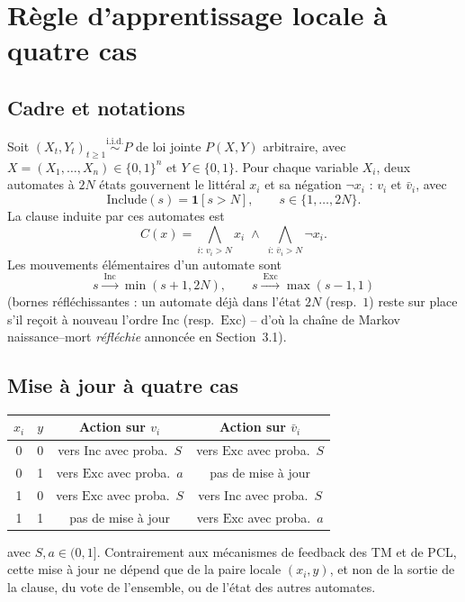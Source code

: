 \documentclass[12pt,a4paper]{article}
\newcommand{\Inc}{\ensuremath{\mathrm{Inc}}}
\newcommand{\Exc}{\ensuremath{\mathrm{Exc}}}
\newcommand{\vbar}{\bar{v}}
\begin{document}
\section{Règle d'apprentissage locale à quatre cas}

\subsection{Cadre et notations}

Soit $(X_t,Y_t)_{t\ge1}\overset{\mathrm{i.i.d.}}{\sim}P$ de loi jointe
$P(X,Y)$ arbitraire, avec $X=(X_1,\ldots,X_n)\in\{0,1\}^n$ et $Y\in\{0,1\}$.
Pour chaque variable $X_i$, deux automates à $2N$ états gouvernent le
littéral $x_i$ et sa négation $\neg x_i$ : $v_i$ et $\vbar_i$, avec
\[
  \mathrm{Include}(s) = \mathbf 1[s>N], \qquad s\in\{1,\ldots,2N\}.
\]
La clause induite par ces automates est
\[
  C(x) = \bigwedge_{i:\,v_i>N} x_i \;\wedge\; \bigwedge_{i:\,\vbar_i>N} \neg x_i.
\]
Les mouvements élémentaires d'un automate sont
\[
  s \xrightarrow{\ \Inc\ } \min(s+1,2N), \qquad
  s \xrightarrow{\ \Exc\ } \max(s-1,1)
\]
(bornes réfléchissantes : un automate déjà dans l'état $2N$ (resp.\ $1$) reste
sur place s'il reçoit à nouveau l'ordre $\Inc$ (resp.\ $\Exc$) -- d'où la
chaîne de Markov naissance--mort \emph{réfléchie} annoncée en Section~3.1).

\subsection{Mise à jour à quatre cas}

\begin{center}
\begin{tabular}{cccc}
\toprule
$x_i$ & $y$ & Action sur $v_i$ & Action sur $\vbar_i$ \\
\midrule
0 & 0 & vers $\Inc$ avec proba.\ $S$ & vers $\Exc$ avec proba.\ $S$ \\
0 & 1 & vers $\Exc$ avec proba.\ $a$ & pas de mise à jour \\
1 & 0 & vers $\Exc$ avec proba.\ $S$ & vers $\Inc$ avec proba.\ $S$ \\
1 & 1 & pas de mise à jour & vers $\Exc$ avec proba.\ $a$ \\
\bottomrule
\end{tabular}
\end{center}
avec $S,a\in(0,1]$. Contrairement aux mécanismes de feedback des TM et de
PCL, cette mise à jour ne dépend que de la paire locale $(x_i,y)$, et non
de la sortie de la clause, du vote de l'ensemble, ou de l'état des autres
automates.
\end{document}
